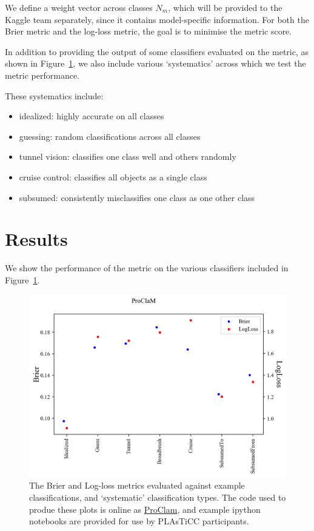 \documentclass[\docopts]{\docclass}
\begin{document}
\begin{itemize}
We define a weight vector across classes $N_m$, which will be provided to the Kaggle team separately, since it contains model-specific information. For both the Brier metric and the log-loss metric, the goal is to minimise the metric score.

In addition to providing the output of some classifiers evaluated on the metric, as shown in Figure~\ref{fig:ProClam}, we also include various `systematics' across which we test the metric performance.

These systematics include:

\begin{itemize}
\item idealized: highly accurate on all classes
\item guessing: random classifications across all classes
\item tunnel vision: classifies one class well and others randomly
\item cruise control: classifies all objects as a single class
\item subsumed: consistently misclassifies one class as one other class
\end{itemize}

\section{Results}
\label{sec:results}


We show the performance of the metric on the various classifiers included in Figure~\ref{fig:ProClam}.

\begin{figure}[htbp!]
\begin{center}
 \includegraphics[width=0.95\linewidth,angle=0]{figures/ProClaM_results.png}
\caption{\label{fig:ProClam} The Brier and Log-loss metrics evaluated against example classifications, and `systematic' classification types. The code used to produe these plots is online as \href{https://github.com/aimalz/proclam/}{ProClam}, and example ipython notebooks are provided for use by PLAsTiCC participants.}
\end{center}
\end{figure}


\end{itemize}
\end{document}
